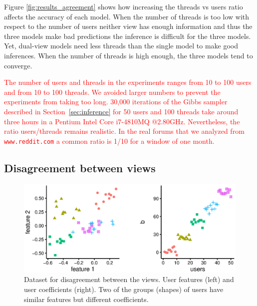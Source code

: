 \documentclass[smallextended]{svjour3}          %
\newcommand\alberto[1]{\textcolor{red}{#1}}
\begin{document}
Figure \ref{fig:results_agreement} shows how increasing the threads vs users ratio affects the accuracy of each model. When the number of threads is too low with respect to the number of users neither view has enough information and thus the three models make bad predictions the inference is difficult for the three models. Yet, dual-view models need less threads than the single model to make good inferences. When the number of threads is high enough, the three models tend to converge.

\alberto{The number of users and threads in the experiments ranges from 10 to 100 users and from 10 to 100 threads. We avoided larger numbers to prevent the experiments from taking too long. 30,000 iterations of the Gibbs sampler described in Section~\ref{sec:inference} for 50 users and 100 threads take around three hours in a Pentium Intel Core i7-4810MQ @2.80GHz. Nevertheless, the ratio users/threads remains realistic. In the real forums that we analyzed from \texttt{www.reddit.com} a common ratio is 1/10 for a window of one month.}
\subsection{Disagreement between views}

\begin{figure}
	\centering
	\includegraphics[width=1\textwidth]{Fig4_data_disagreement_bw}
	\caption{Dataset for disagreement between the views. User features (left) and user coefficients (right). Two of the groups (shapes) of users have similar features but different coefficients.}
	\label{fig:data_disagreement}
\end{figure}
\end{document}
